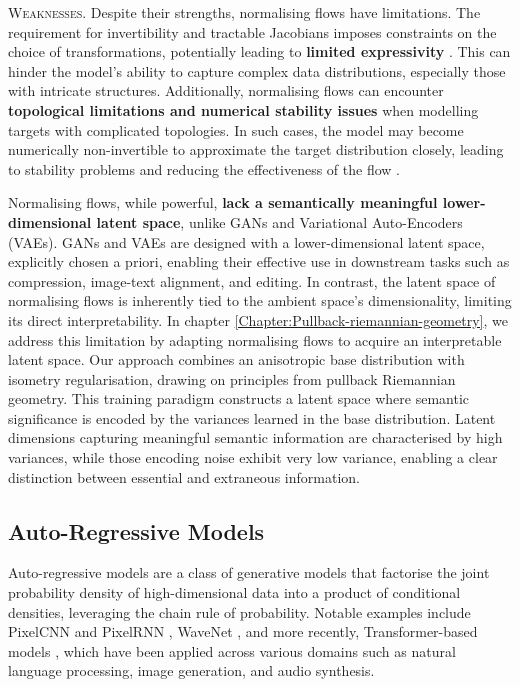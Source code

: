 \textsc{Weaknesses.} Despite their strengths, normalising flows have limitations. The requirement for invertibility and tractable Jacobians imposes constraints on the choice of transformations, potentially leading to \textbf{limited expressivity} \cite{papamakarios2019normalizing}. This can hinder the model's ability to capture complex data distributions, especially those with intricate structures. Additionally, normalising flows can encounter \textbf{topological limitations and numerical stability issues} when modelling targets with complicated topologies. In such cases, the model may become numerically non-invertible to approximate the target distribution closely, leading to stability problems and reducing the effectiveness of the flow \cite{behrmann2021understanding, cornish2020relaxing}. 

Normalising flows, while powerful, \textbf{lack a semantically meaningful lower-dimensional latent space}, unlike GANs and Variational Auto-Encoders (VAEs). GANs and VAEs are designed with a lower-dimensional latent space, explicitly chosen a priori, enabling their effective use in downstream tasks such as compression, image-text alignment, and editing. In contrast, the latent space of normalising flows is inherently tied to the ambient space's dimensionality, limiting its direct interpretability. In chapter \ref{Chapter:Pullback-riemannian-geometry}, we address this limitation by adapting normalising flows to acquire an interpretable latent space. Our approach combines an anisotropic base distribution with isometry regularisation, drawing on principles from pullback Riemannian geometry. This training paradigm constructs a latent space where semantic significance is encoded by the variances learned in the base distribution. Latent dimensions capturing meaningful semantic information are characterised by high variances, while those encoding noise exhibit very low variance, enabling a clear distinction between essential and extraneous information.

\subsection{Auto-Regressive Models}\label{sec:auto_regressive_models}

Auto-regressive models are a class of generative models that factorise the joint probability density of high-dimensional data into a product of conditional densities, leveraging the chain rule of probability. Notable examples include PixelCNN and PixelRNN \cite{oord2016pixel}, WaveNet \cite{vanwavenet2016}, and more recently, Transformer-based models \cite{vaswani2017attention}, which have been applied across various domains such as natural language processing, image generation, and audio synthesis.

